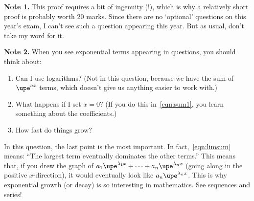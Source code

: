 \documentclass[english,12pt,a4paper]{scrartcl}
\begin{document}
\begin{itemize}
    \textbf{Note 1.} This proof requires a bit of ingenuity (!), which is why a 
    relatively short proof is probably worth 20 marks. Since there are no 
    `optional' questions on this year's exam, I can't see such a question 
    appearing this year. But as usual, don't take my word for it.

    \textbf{Note 2.} When you see exponential terms appearing in questions, you 
    should think about:
    \begin{enumerate}
      \item Can I use logarithms? (Not in this question, because we have the 
        sum of $\upe^{ax}$ terms, which doesn't give us anything easier to work 
        with.)
      \item What happens if I set $x = 0$? (If you do this in~\eqref{eqn:sum1}, 
        you learn something about the coefficients.)
      \item How fast do things grow?
    \end{enumerate}
    In this question, the last point is the most important. In 
    fact,~\eqref{eqn:limsum} means: ``The largest term eventually dominates the 
    other terms.'' This means that, if you drew the graph of $a_1 
    \upe^{\lambda_1 x} + \dots + a_n \upe^{\lambda_n x}$ (going along in the 
    positive $x$-direction), it would eventually look like $a_n \upe^{\lambda_n 
    x}$. This is why exponential growth (or decay) is so interesting in 
    mathematics. See sequences and series!
\end{itemize}
\end{document}
